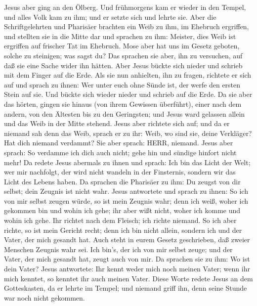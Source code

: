  Jesus aber ging an den Ölberg.  Und frühmorgens
kam er wieder in den Tempel, und alles Volk kam zu ihm; und er setzte
sich und lehrte sie.  Aber die Schriftgelehrten und
Pharisäer brachten ein Weib zu ihm, im Ehebruch ergriffen, und stellten
sie in die Mitte dar  und sprachen zu ihm: Meister, dies
Weib ist ergriffen auf frischer Tat im Ehebruch.  Mose aber
hat uns im Gesetz geboten, solche zu steinigen; was sagst du?
 Das sprachen sie aber, ihn zu versuchen, auf daß sie eine
Sache wider ihn hätten. Aber Jesus bückte sich nieder und schrieb mit
dem Finger auf die Erde.  Als sie nun anhielten, ihn zu
fragen, richtete er sich auf und sprach zu ihnen: Wer unter euch ohne
Sünde ist, der werfe den ersten Stein auf sie.  Und bückte
sich wieder nieder und schrieb auf die Erde.  Da sie aber
das hörten, gingen sie hinaus (von ihrem Gewissen überführt), einer nach
dem andern, von den Ältesten bis zu den Geringsten; und Jesus ward
gelassen allein und das Weib in der Mitte stehend.  Jesus
aber richtete sich auf; und da er niemand sah denn das Weib, sprach er
zu ihr: Weib, wo sind sie, deine Verkläger? Hat dich niemand verdammt?
 Sie aber sprach: HERR, niemand. Jesus aber sprach: So
verdamme ich dich auch nicht; gehe hin und sündige hinfort nicht mehr!
 Da redete Jesus abermals zu ihnen und sprach: Ich bin das
Licht der Welt; wer mir nachfolgt, der wird nicht wandeln in der
Finsternis, sondern wir das Licht des Lebens haben.  Da
sprachen die Pharisäer zu ihm: Du zeugst von dir selbst; dein Zeugnis
ist nicht wahr.  Jesus antwortete und sprach zu ihnen: So
ich von mir selbst zeugen würde, so ist mein Zeugnis wahr; denn ich
weiß, woher ich gekommen bin und wohin ich gehe; ihr aber wißt nicht,
woher ich komme und wohin ich gehe.  Ihr richtet nach dem
Fleisch; ich richte niemand.  So ich aber richte, so ist
mein Gericht recht; denn ich bin nicht allein, sondern ich und der
Vater, der mich gesandt hat.  Auch steht in eurem Gesetz
geschrieben, daß zweier Menschen Zeugnis wahr sei.  Ich
bin's, der ich von mir selbst zeuge; und der Vater, der mich gesandt
hat, zeugt auch von mir.  Da sprachen sie zu ihm: Wo ist
dein Vater? Jesus antwortete: Ihr kennt weder mich noch meinen Vater;
wenn ihr mich kenntet, so kenntet ihr auch meinen Vater. 
Diese Worte redete Jesus an dem Gotteskasten, da er lehrte im Tempel;
und niemand griff ihn, denn seine Stunde war noch nicht gekommen.
